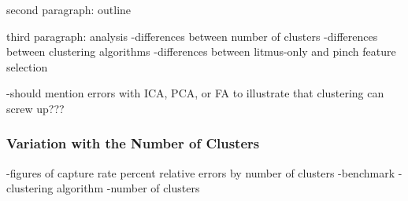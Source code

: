 second paragraph: outline

third paragraph: analysis
-differences between number of clusters
-differences between clustering algorithms
-differences between litmus-only and pinch feature selection

-should mention errors with ICA, PCA, or FA to illustrate that clustering can screw up??? 

\subsubsection{Variation with the Number of Clusters}
\label{subsec:chap11-imgxs-capt-rates-num-clusters}

-figures of capture rate percent relative errors by number of clusters
  -benchmark
  -clustering algorithm
  -number of clusters


